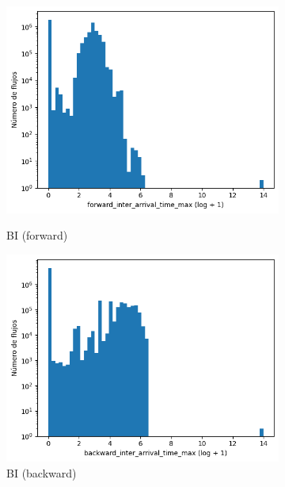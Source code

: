 \begin{figure}[H]
\begin{subfigure}[b]{0.26\textwidth}
        \includegraphics[width=\textwidth]{media/packet_pincer_botiot/forward_inter_arrival_time_max_log_x_log_y.png}
        \caption{BI (forward)}
        \includegraphics[width=\textwidth]{media/packet_pincer_botiot/backward_inter_arrival_time_max_log_x_log_y.png}
        \caption{BI (backward)}
    \end{subfigure}
    \hfill
    \begin{subfigure}[b]{0.26\textwidth}
        \centering

\end{subfigure}
\end{figure}
